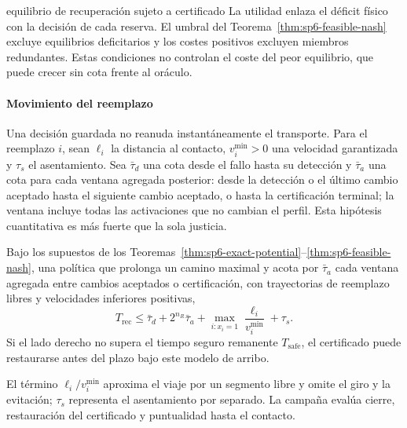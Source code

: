 \begin{contribucion}{equilibrio de recuperación sujeto a certificado}
La utilidad enlaza el déficit físico con la decisión de cada reserva. El umbral del Teorema~\ref{thm:sp6-feasible-nash} excluye equilibrios deficitarios y los costes positivos excluyen miembros redundantes. Estas condiciones no controlan el coste del peor equilibrio, que puede crecer sin cota frente al oráculo.
\end{contribucion}

\paragraph{Movimiento del reemplazo}

Una decisión guardada no reanuda instantáneamente el transporte. Para el reemplazo $i$, sean $\ell_i$ la distancia al contacto, $v_i^{\min}>0$ una velocidad garantizada y $\tau_s$ el asentamiento. Sea $\bar\tau_d$ una cota desde el fallo hasta su detección y $\bar\tau_a$ una cota para cada ventana agregada posterior: desde la detección o el último cambio aceptado hasta el siguiente cambio aceptado, o hasta la certificación terminal; la ventana incluye todas las activaciones que no cambian el perfil. Esta hipótesis cuantitativa es más fuerte que la sola justicia.

\begin{corolario}
\label{cor:sp6-time-bound}
Bajo los supuestos de los Teoremas~\ref{thm:sp6-exact-potential}--\ref{thm:sp6-feasible-nash}, una política que prolonga un camino maximal y acota por $\bar\tau_a$ cada ventana agregada entre cambios aceptados o certificación, con trayectorias de reemplazo libres y velocidades inferiores positivas,
\begin{equation}
\label{eq:sp6-time-bound}
 T_{\mathrm{rec}}
 \leq \bar\tau_d+2^{n_R}\bar\tau_a
 +\max_{i:x_i=1}\frac{\ell_i}{v_i^{\min}}+\tau_s.
\end{equation}
Si el lado derecho no supera el tiempo seguro remanente $T_{\mathrm{safe}}$, el certificado puede restaurarse antes del plazo bajo este modelo de arribo.
\end{corolario}

El término $\ell_i/v_i^{\min}$ aproxima el viaje por un segmento libre y omite el giro y la evitación; $\tau_s$ representa el asentamiento por separado. La campaña evalúa cierre, restauración del certificado y puntualidad hasta el contacto.

